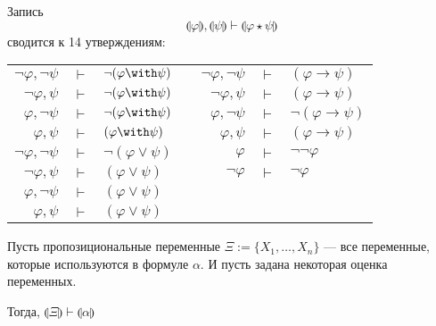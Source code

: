 

Запись
$$\llparenthesis\varphi\rrparenthesis, \llparenthesis\psi\rrparenthesis \vdash \llparenthesis\varphi\star\psi\rrparenthesis$$
сводится к 14 утверждениям:

\begin{center}\begin{tabular}{rclp{1cm}rcl}
$\neg\varphi, \neg\psi$&$ \vdash $&$\neg (\varphi \with \psi)$& & $\neg\varphi, \neg\psi$&$ \vdash $&$     (\varphi \rightarrow  \psi)$ \\
$\neg\varphi,     \psi$&$ \vdash $&$\neg (\varphi \with \psi)$& &$\neg\varphi,     \psi$&$ \vdash $&$     (\varphi \rightarrow  \psi)$ \\
$    \varphi, \neg\psi$&$ \vdash $&$\neg (\varphi \with \psi)$& &$ \varphi, \neg\psi$&$ \vdash $&$\neg (\varphi \rightarrow  \psi)$ \\
$    \varphi,     \psi$&$ \vdash $&$     (\varphi \with \psi)$& &$    \varphi,     \psi$&$ \vdash $&$     (\varphi \rightarrow  \psi)$ \\
$\neg\varphi, \neg\psi$&$ \vdash $&$\neg (\varphi \vee  \psi)$& &$    \varphi          $&$ \vdash $&$     \neg\neg\varphi$ \\
$\neg\varphi,     \psi$&$ \vdash $&$     (\varphi \vee  \psi)$& &$\neg\varphi          $&$ \vdash $&$         \neg\varphi$\\
$    \varphi, \neg\psi$&$ \vdash $&$     (\varphi \vee  \psi)$ \\
$    \varphi,     \psi$&$ \vdash $&$     (\varphi \vee  \psi)$
\end{tabular}\end{center}


Пусть пропозициональные переменные $\Xi := \{X_1, \dots, X_n\}$ ---
все переменные, которые используются в формуле $\alpha$. И пусть
задана некоторая оценка переменных.

Тогда, $\llparenthesis \Xi \rrparenthesis \vdash\llparenthesis\alpha\rrparenthesis$


